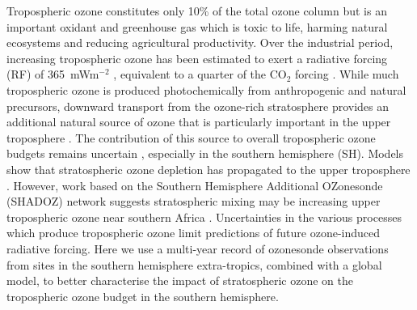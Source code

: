 \documentclass[acp, manuscript]{copernicus} %
\begin{document}
\introduction  %
%

  Tropospheric ozone constitutes only 10\% of the total ozone column but is an important oxidant and greenhouse gas which is toxic to life, harming natural ecosystems and reducing agricultural productivity.
  Over the industrial period, increasing tropospheric ozone has been estimated to exert a radiative forcing (RF) of 365~mWm$^{-2}$  \citep{Stevenson2013}, equivalent to a quarter of the CO$_2$ forcing \citep{IPCC_Chapter2}. 
  While much tropospheric ozone is produced photochemically from anthropogenic and natural precursors, %
  downward transport from the ozone-rich stratosphere provides an additional natural source of ozone that is particularly important in the upper troposphere \citep[][and references therein]{Jacobson2000}.
  The contribution of this source to overall tropospheric ozone budgets remains uncertain \citep{Skerlak2014}, especially in the southern hemisphere (SH).
  Models show that stratospheric ozone depletion has propagated to the upper troposphere \citep{Stevenson2013}. 
  However, work based on the Southern Hemisphere Additional OZonesonde (SHADOZ) network suggests stratospheric mixing may be increasing upper tropospheric ozone near southern Africa \citep{Liu2015, Thompson2014}.
  Uncertainties in the various processes which produce tropospheric ozone limit predictions of future ozone-induced radiative forcing.
  Here we use a multi-year record of ozonesonde observations from sites in the southern hemisphere extra-tropics, combined with a global model, to better characterise the impact of stratospheric ozone on the tropospheric ozone budget in the southern hemisphere.
\end{document}
